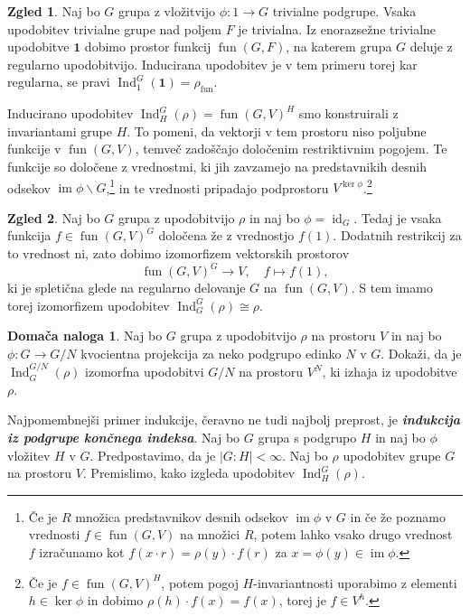\documentclass[11pt]{book}
\def\11{\mathbf{1}}
\DeclareMathOperator\image{im}
\DeclareMathOperator\Ind{Ind}
\DeclareMathOperator\fun{fun}
\DeclareMathOperator\id{id}
\def\definicija{\color{rdeca}\bf\em}
\theoremstyle{definition}
\theoremstyle{zgled}
\newtheorem*{zgled}{Zgled}
\theoremstyle{odprtproblem}
\theoremstyle{domacanaloga}
\newtheorem*{domacanaloga}{Domača naloga}
\theoremstyle{izrek}
\begin{document}
\begin{zgled}
Naj bo $G$ grupa z vložitvijo $\phi \colon 1 \to G$ trivialne podgrupe. Vsaka upodobitev trivialne grupe nad poljem $F$ je trivialna. Iz enorazsežne trivialne upodobitve $\11$ dobimo prostor funkcij $\fun(G,F)$, na katerem grupa $G$ deluje z regularno upodobitvijo. Inducirana upodobitev je v tem primeru torej kar regularna, se pravi $\Ind^G_1(\11) = \rho_{\fun}$.
\end{zgled}

Inducirano upodobitev $\Ind^G_H(\rho) = \fun(G,V)^H$ smo konstruirali z invariantami grupe $H$. To pomeni, da vektorji v tem prostoru niso poljubne funkcije v $\fun(G,V)$, temveč zadoščajo določenim restriktivnim pogojem. Te funkcije so določene z vrednostmi, ki jih zavzamejo na predstavnikih desnih odsekov $\image \phi \backslash G$,\footnote{Če je $R$ množica predstavnikov desnih odsekov $\image \phi$ v $G$ in če že poznamo vrednosti $f \in \fun(G,V)$ na množici $R$, potem lahko vsako drugo vrednost $f$ izračunamo kot $f(x \cdot r) = \rho(y) \cdot f(r)$ za $x = \phi(y) \in \image \phi$.} in te vrednosti pripadajo podprostoru $V^{\ker \phi}$.\footnote{Če je $f \in \fun(G,V)^H$, potem pogoj $H$-invariantnosti uporabimo z elementi $h \in \ker \phi$ in dobimo $\rho(h) \cdot f(x) = f(x)$, torej je $f \in V^h$.}

\begin{zgled}
Naj bo $G$ grupa z upodobitvijo $\rho$ in naj bo $\phi = \id_G$. Tedaj je vsaka funkcija $f \in \fun(G,V)^G$ določena že z vrednostjo $f(1)$. Dodatnih restrikcij za to vrednost ni, zato dobimo izomorfizem vektorskih prostorov
    \[
        \fun(G,V)^G \to V, \quad
        f \mapsto f(1),
    \]
ki je spletična glede na regularno delovanje $G$ na $\fun(G,V)$. S tem imamo torej izomorfizem upodobitev $\Ind^G_G(\rho) \cong \rho$.
\end{zgled}

\begin{domacanaloga}
    Naj bo $G$ grupa z upodobitvijo $\rho$ na prostoru $V$ in naj bo $\phi \colon G \to G/N$ kvocientna projekcija za neko podgrupo edinko $N$ v $G$. Dokaži, da je $\Ind^{G/N}_G(\rho)$ izomorfna upodobitvi $G/N$ na prostoru $V^N$, ki izhaja iz upodobitve $\rho$.
\end{domacanaloga}

Najpomembnejši primer indukcije, čeravno ne tudi najbolj preprost, je {\definicija indukcija iz podgrupe končnega indeksa}. Naj bo $G$ grupa s podgrupo $H$ in naj bo $\phi$ vložitev $H$ v $G$. Predpostavimo, da je $|G:H| < \infty$. Naj bo $\rho$ upodobitev grupe $G$ na prostoru $V$. Premislimo, kako izgleda upodobitev $\Ind^G_H(\rho)$. 
    
\end{document}
